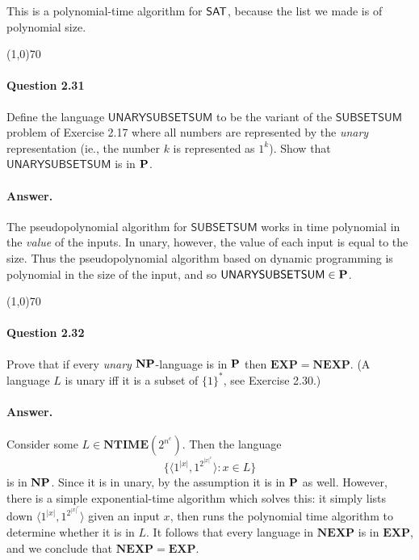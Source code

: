 This is a polynomial-time algorithm for $\mathsf{SAT}$, because the list we made is of polynomial size.

\begin{center}
	\line(1,0){70}
\end{center}

\paragraph{Question 2.31} Define the language $\mathsf{UNARYSUBSETSUM}$ to be the variant of the $\mathsf{SUBSETSUM}$ problem of Exercise 2.17 where all numbers are represented by the \textit{unary} representation (ie., the number $k$ is represented as $1^k$). Show that $\mathsf{UNARYSUBSETSUM}$ is in $\mathbf{P}$.

\paragraph{Answer.} The pseudopolynomial algorithm for $\mathsf{SUBSETSUM}$ works in time polynomial in the \textit{value} of the inputs. In unary, however, the value of each input is equal to the size. Thus the pseudopolynomial algorithm based on dynamic programming is polynomial in the size of the input, and so $\mathsf{UNARYSUBSETSUM}\in\mathbf{P}$.

\begin{center}
	\line(1,0){70}
\end{center}

\paragraph{Question 2.32} Prove that if every \textit{unary} $\mathbf{NP}$-language is in $\mathbf{P}$ then $\mathbf{EXP}=\mathbf{NEXP}$. (A language $L$ is unary iff it is a subset of $\{1\}^{*}$, see Exercise 2.30.)

\paragraph{Answer.} Consider some $L\in\mathbf{NTIME}(2^{n^c})$. Then the language
$$\{\langle1^{|x|}, 1^{2^{|x|^c}}\rangle:x\in L\}$$
is in $\mathbf{NP}$. Since it is in unary, by the assumption it is in $\mathbf{P}$ as well. However, there is a simple exponential-time algorithm which solves this: it simply lists down $\langle1^{|x|}, 1^{2^{|x|^c}}\rangle$ given an input $x$, then runs the polynomial time algorithm to determine whether it is in $L$. It follows that every language in $\mathbf{NEXP}$ is in $\mathbf{EXP}$, and we conclude that $\mathbf{NEXP}=\mathbf{EXP}$.

